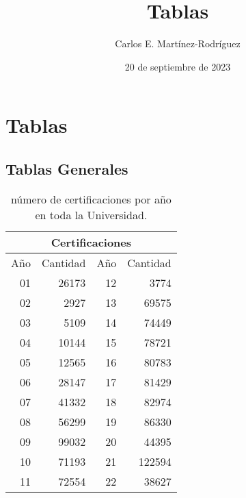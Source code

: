 \documentclass[12pt]{article}
\title{Tablas}
\author{Carlos E. Martínez-Rodríguez}
\date{20 de septiembre de 2023}
\begin{document}
\maketitle

\section{Tablas}

\subsection{Tablas Generales}

\begin{table}[ht]
\centering
\begin{tabular}{||r||r||r|r||}\hline
\multicolumn{4}{|c|}{Certificaciones} \\\hline
Año  & Cantidad  & Año  & Cantidad  \\\hline
01 & 26173& 12 & 3774 \\ 
  02 & 2927 &13 & 69575  \\ 
  03 & 5109 & 14 & 74449\\ 
  04 & 10144 & 15 & 78721\\ 
  05 & 12565 &16 & 80783 \\ 
  06 & 28147 &17 & 81429\\ 
  07 & 41332 &18 & 82974\\ 
  08 & 56299 &19 & 86330\\ 
  09 & 99032 &20 & 44395\\ 
  10 & 71193 &21 & 122594 \\ 
  11 & 72554 &22 & 38627\\
\hline
\end{tabular}
\caption{\label{CertificacionesAnual}n\'umero de certificaciones por a\~no en toda la Universidad.}
\end{table}
\end{document}
